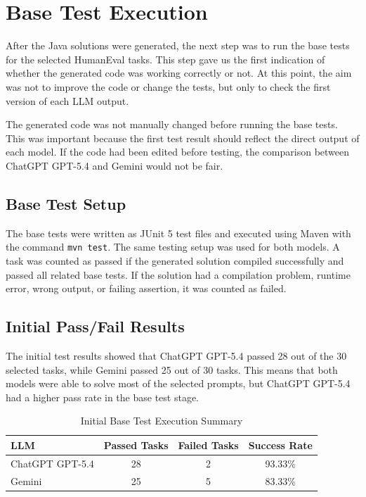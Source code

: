 \documentclass[journal]{IEEEtran}
\begin{document}
\section{Base Test Execution}

After the Java solutions were generated, the next step was to run the base tests for the selected HumanEval tasks. This step gave us the first indication of whether the generated code was working correctly or not. At this point, the aim was not to improve the code or change the tests, but only to check the first version of each LLM output.

The generated code was not manually changed before running the base tests. This was important because the first test result should reflect the direct output of each model. If the code had been edited before testing, the comparison between ChatGPT GPT-5.4 and Gemini would not be fair.

\subsection{Base Test Setup}

The base tests were written as JUnit 5 test files and executed using Maven with the command \texttt{mvn test}. The same testing setup was used for both models. A task was counted as passed if the generated solution compiled successfully and passed all related base tests. If the solution had a compilation problem, runtime error, wrong output, or failing assertion, it was counted as failed.

\subsection{Initial Pass/Fail Results}

The initial test results showed that ChatGPT GPT-5.4 passed 28 out of the 30 selected tasks, while Gemini passed 25 out of 30 tasks. This means that both models were able to solve most of the selected prompts, but ChatGPT GPT-5.4 had a higher pass rate in the base test stage.

\begin{table}[!t]
\renewcommand{\arraystretch}{1.2}
\caption{Initial Base Test Execution Summary}
\label{tab:base-test-summary}
\centering
\begin{tabular}{lccc}
\toprule
\textbf{LLM} & \textbf{Passed Tasks} & \textbf{Failed Tasks} & \textbf{Success Rate} \\
\midrule
ChatGPT GPT-5.4 & 28 & 2 & 93.33\% \\
Gemini & 25 & 5 & 83.33\% \\
\bottomrule
\end{tabular}
\end{table}
\end{document}
